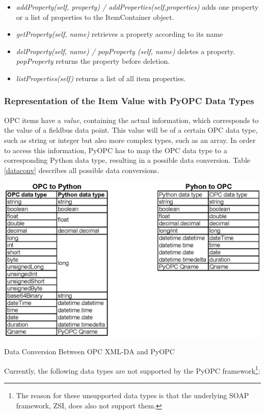 \begin{itemize}
\item{\sl addProperty(self, property) /
addProperties(self,properties)} adds one property or a list of
properties to the ItemContainer object.
\item{\sl getProperty(self, name)} retrieves a property according to
its name
\item{\sl delProperty(self, name) / popProperty (self, name)} deletes
a property. {\sl popProperty} returns the property before deletion.
\item{\sl listProperties(self)} returns a list of all item properties.
\end{itemize}


\subsubsection*{Representation of the Item Value with PyOPC Data Types}

OPC items have a {\sl value}, containing the actual information, which
corresponds to the value of a fieldbus data point. This value will be
of a certain OPC data type, such as string or integer but also more
complex types, such as an array. In order to access this information,
PyOPC has to map the OPC data type to a corresponding Python data
type, resulting in a possible data conversion. Table \ref{dataconv}
describes all possible data conversions.

\begin{table}[ht]
\centering
\includegraphics[scale=0.7]{graphics/dataconv.eps}
\caption{Data Conversion Between OPC XML-DA and PyOPC}
\label{dataconv} 
\end{table}

Currently, the following data types are not supported by the PyOPC
framework\footnote{The reason for these unsupported data types is that
the underlying SOAP framework, ZSI, does also not support them.}:

